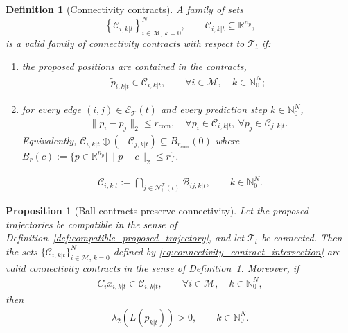 \documentclass[10pt,a4paper]{amsart}
\newtheorem{definition}{Definition}
\newtheorem{proposition}{Proposition}
\newcommand{\Ball}[2]{B_{#1}\!\left(#2\right)}
\begin{document}
\begin{definition}[Connectivity contracts]
	\label{def:connectivity_contracts}
	A family of sets
	\[
		\left\{\mathcal{C}_{i,k|t}\right\}_{i\in\mathcal{M},\,k=0}^{N},
		\qquad
		\mathcal{C}_{i,k|t}\subseteq\mathbb{R}^{n_p},
	\]
	is a valid family of connectivity contracts with respect to $\mathcal{T}_t$ if:

	\begin{enumerate}
		\item the proposed positions are contained in the contracts,
		      \begin{align}
			      \tilde p_{i,k|t}\in\mathcal{C}_{i,k|t},
			      \qquad
			      \forall i\in\mathcal{M},\quad k\in\mathbb{N}_0^N;
			      \label{eq:proposed_positions_inside_connectivity_contracts}
		      \end{align}

		\item for every edge $(i,j)\in\mathcal{E}_{\mathcal{T}}(t)$ and every
		      prediction step $k\in\mathbb{N}_0^N$,
		      \begin{align}
			      \|p_i-p_j\|_2 \leq r_{\mathrm{com}},
			      \quad
			      \forall p_i\in\mathcal{C}_{i,k|t},\
			      \forall p_j\in\mathcal{C}_{j,k|t}.
			      \label{eq:pairwise_connectivity_contract_condition}
		      \end{align}
		      Equivalently,
		      $\mathcal{C}_{i,k|t}\oplus(-\mathcal{C}_{j,k|t})
			      \subseteq \Ball{r_{\mathrm{com}}}{0}$ where $\Ball{r}{c}:=\{p\in\mathbb{R}^{n_p}\mid \|p-c\|_2\le r\}$.
	\end{enumerate}
\end{definition}

\begin{align}
	\mathcal{C}_{i,k|t}
	:=
	\bigcap_{j\in\mathcal{N}^{\mathcal{T}}_i(t)}
	\mathcal{B}_{ij,k|t},
	\qquad
	k\in\mathbb{N}_0^N.
	\label{eq:connectivity_contract_intersection}
\end{align}

\begin{proposition}[Ball contracts preserve connectivity]
	\label{prop:ball_contracts_preserve_connectivity}
	Let the proposed trajectories be compatible in the sense of
	Definition~\ref{def:compatible_proposed_trajectory}, and let
	$\mathcal{T}_t$ be connected. Then the sets
	$\{\mathcal{C}_{i,k|t}\}_{i\in\mathcal{M},\,k=0}^{N}$ defined by
	\eqref{eq:connectivity_contract_intersection} are valid connectivity contracts
	in the sense of Definition~\ref{def:connectivity_contracts}. Moreover, if
	\begin{align}
		C_i x_{i,k|t}\in\mathcal{C}_{i,k|t},
		\qquad
		\forall i\in\mathcal{M},\quad k\in\mathbb{N}_0^N,
	\end{align}
	then
	\begin{align}
		\lambda_2\!\left(L(p_{k|t})\right)>0,
		\qquad
		k\in\mathbb{N}_0^N.
	\end{align}
\end{proposition}
\end{document}
